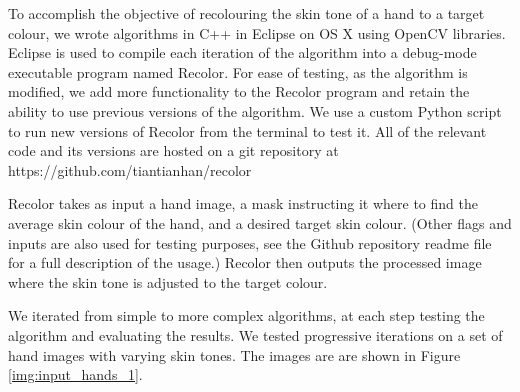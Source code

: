 To accomplish the objective of recolouring the skin tone of a hand to a target colour, we wrote algorithms in C++ in Eclipse on OS X using OpenCV libraries. Eclipse is used to compile each iteration of the algorithm into a debug-mode executable program named Recolor. For ease of testing, as the algorithm is modified, we add more functionality to the Recolor program and retain the ability to use previous versions of the algorithm. We use a custom Python script to run new versions of Recolor from the terminal to test it. All of the relevant code and its versions are hosted on a git repository at https://github.com/tiantianhan/recolor

Recolor takes as input a hand image, a mask instructing it where to find the average skin colour of the hand, and a desired target skin colour. (Other flags and inputs are also used for testing purposes, see the Github repository readme file for a full description of the usage.) Recolor then outputs the processed image where the skin tone is adjusted to the target colour.

We iterated from simple to more complex algorithms, at each step testing the algorithm and evaluating the results. We tested progressive iterations on a set of hand images with varying skin tones. The images are are shown in Figure \ref{img:input_hands_1}.


